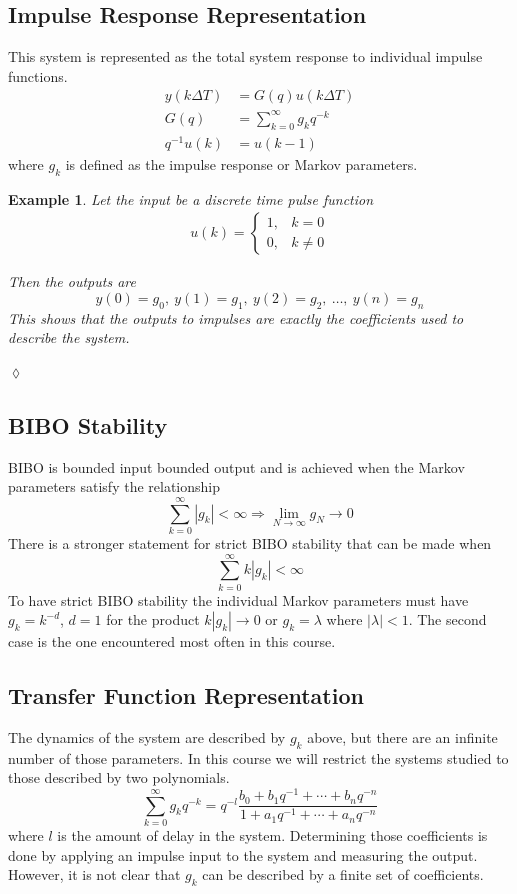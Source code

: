 \documentclass[lecture,12pt,]{pcms-l}
\theoremstyle{example}
\newtheorem{example}{Example}[section]
\newcommand{\dt}{\Delta T}
\begin{document}
\subsection{Impulse Response Representation}
This system is represented as the total system response to individual impulse functions.
\begin{align*}
y(k\dt) &= G(q)u(k\dt) \\
G(q) &= \sum_{k=0}^\infty g_kq^{-k} \\
q^{-1}u(k) &= u(k-1)
\end{align*}
where $g_k$ is defined as the impulse response or Markov parameters.

\begin{example}
Let the input be a discrete time pulse function
\begin{align}
\label{eq:03impulse}
u(k) = \begin{cases} 1, & k=0 \\ 0, & k\neq 0 \end{cases}
\end{align}

Then the outputs are
$$y(0)=g_0, ~y(1)=g_1, ~y(2)=g_2, ~\ldots, ~y(n)=g_n$$
This shows that the outputs to impulses are exactly the coefficients used to describe the system.
\end{example}
$\lozenge$

\subsection{BIBO Stability}
BIBO is bounded input bounded output and is achieved when the Markov parameters satisfy the relationship
$$\sum_{k=0}^\infty |g_k| < \infty \Rightarrow \lim_{N\to \infty} g_N \to 0$$
There is a stronger statement for strict BIBO stability that can be made when
$$\sum_{k=0}^\infty k|g_k| < \infty$$
To have strict BIBO stability the individual Markov parameters must have $g_k=k^{-d}$, $d=1$ for the product $k|g_k|\to 0$ or $g_k=\lambda$ where $|\lambda|<1$. The second case is the one encountered most often in this course.

\subsection{Transfer Function Representation}
The dynamics of the system are described by $g_k$ above, but there are an infinite number of those parameters. In this course we will restrict the systems studied to those described by two polynomials.
$$\sum_{k=0}^\infty g_kq^{-k} = q^{-l} \frac{b_0 + b_1q^{-1} + \cdots + b_nq^{-n}}{1+a_1q^{-1} + \cdots + a_nq^{-n}}$$
where $l$ is the amount of delay in the system. Determining those coefficients is done by applying an impulse input to the system and measuring the output. However, it is not clear that $g_k$ can be described by a finite set of coefficients.
\end{document}
